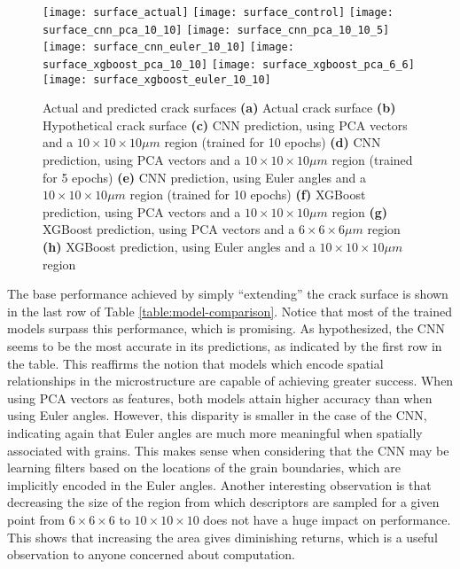 \begin{figure}[b]
  \centering
    \texttt{[image: surface\_actual]} %
    \texttt{[image: surface\_control]} %
    \texttt{[image: surface\_cnn\_pca\_10\_10]} %
    \texttt{[image: surface\_cnn\_pca\_10\_10\_5]} %
    \texttt{[image: surface\_cnn\_euler\_10\_10]} %
    \texttt{[image: surface\_xgboost\_pca\_10\_10]} %
    \texttt{[image: surface\_xgboost\_pca\_6\_6]} %
    \texttt{[image: surface\_xgboost\_euler\_10\_10]} %
    \caption{Actual and predicted crack surfaces \textbf{(a)} Actual crack surface
             \textbf{(b)} Hypothetical crack surface
             \textbf{(c)} CNN prediction, using PCA vectors and a $10 \times 10 \times 10 \mu m$ region (trained for 10 epochs)
             \textbf{(d)} CNN prediction, using PCA vectors and a $10 \times 10 \times 10 \mu m$ region (trained for 5 epochs)
             \textbf{(e)} CNN prediction, using Euler angles and a $10 \times 10 \times 10 \mu m$ region (trained for 10 epochs)
             \textbf{(f)} XGBoost prediction, using PCA vectors and a $10 \times 10 \times 10 \mu m$ region
             \textbf{(g)} XGBoost prediction, using PCA vectors and a $6 \times 6 \times 6 \mu m$ region
             \textbf{(h)} XGBoost prediction, using Euler angles and a $10 \times 10 \times 10 \mu m$ region }
    \label{fig:surfaces}
\end{figure}

The base performance achieved by simply ``extending'' the crack surface is shown in the last row of Table \ref{table:model-comparison}.  Notice that most of the trained models surpass this performance, which is promising.  As hypothesized, the CNN seems to be the most accurate in its predictions, as indicated by the first row in the table.  This reaffirms the notion that models which encode spatial relationships in the microstructure are capable of achieving greater success.  When using PCA vectors as features, both models attain higher accuracy than when using Euler angles.  However, this disparity is smaller in the case of the CNN, indicating again that Euler angles are much more meaningful when spatially associated with grains.  This makes sense when considering that the CNN may be learning filters based on the locations of the grain boundaries, which are implicitly encoded in the Euler angles.  Another interesting observation is that decreasing the size of the region from which descriptors are sampled for a given point from $6 \times 6 \times 6$ to $10 \times 10 \times 10$ does not have a huge impact on performance.  This shows that increasing the area gives diminishing returns, which is a useful observation to anyone concerned about computation.

